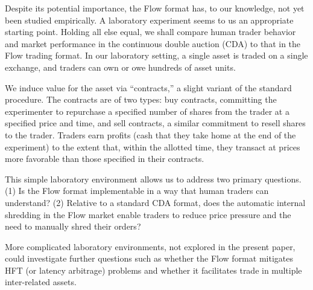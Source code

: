 \documentclass[12pt]{article}
\begin{document}
Despite its potential importance, the Flow format has, to our knowledge, not yet been studied empirically.
A laboratory experiment seems to us an appropriate starting point. 
Holding all else equal, we shall compare human trader behavior and market performance in the continuous double auction (CDA) to that in the  Flow trading format. In our laboratory setting, a single asset is traded on a single exchange, and traders can own or owe hundreds of asset units. 

We induce value for the asset via ``contracts,'' a slight variant of the standard procedure.  
The contracts are of two types: buy contracts, committing the experimenter to repurchase a specified number of shares from the trader at a specified price and time, and sell contracts, a similar commitment to resell shares to the trader. Traders earn profits (cash that they take home at the end of the experiment) to the extent that,
within the allotted time,
they transact at prices more favorable than those specified in their contracts.

This simple laboratory environment allows us to address two primary questions.
(1) Is the Flow format implementable in a way that human traders can understand?
(2) Relative to a standard CDA format, does the automatic internal shredding in the Flow market enable traders to reduce price pressure and the need to manually shred their orders?

More complicated laboratory environments, not explored in the present paper, could investigate  further questions such as whether the Flow format mitigates HFT (or latency arbitrage) problems  and whether
it facilitates trade in multiple inter-related assets.

\end{document}

